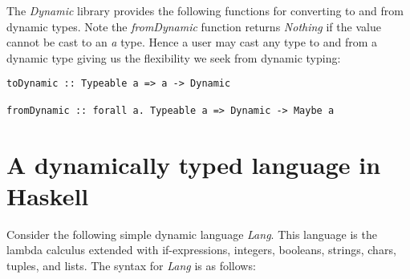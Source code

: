 \documentclass{article}
\begin{document}
The \textit{Dynamic} library provides the following functions for converting to and from dynamic types. Note the \textit{fromDynamic} function returns \textit{Nothing} if the value cannot be cast to an \textit{a} type. Hence a user may cast any type to and from a dynamic type giving us the flexibility we seek from dynamic typing:
\begin{verbatim}
toDynamic :: Typeable a => a -> Dynamic

fromDynamic :: forall a. Typeable a => Dynamic -> Maybe a
\end{verbatim}

\section*{A dynamically typed language in Haskell}
Consider the following simple dynamic language \textit{Lang}. This language is the lambda calculus extended with if-expressions, integers, booleans, strings, chars, tuples, and lists. The syntax for \textit{Lang} is as follows:
\end{document}
